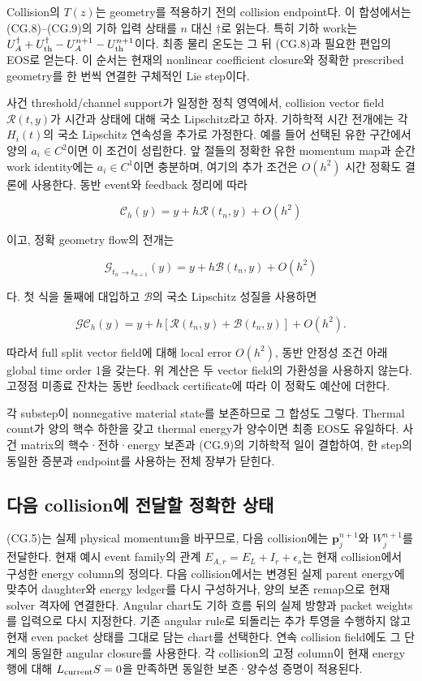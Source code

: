 \documentclass[11pt,a4paper]{article}
\begin{document}
Collision의 \(T(z)\)는 geometry를 적용하기 전의 collision endpoint다. 이 합성에서는 (CG.8)--(CG.9)의 기하 입력 상태를 \(n\) 대신 \(\dagger\)로 읽는다. 특히 기하 work는 \(U_A^\dagger+U_{\rm th}^\dagger-U_A^{n+1}-U_{\rm th}^{n+1}\)이다. 최종 물리 온도는 그 뒤 (CG.8)과 필요한 편입의 EOS로 얻는다. 이 순서는 현재의 nonlinear coefficient closure와 정확한 prescribed geometry를 한 번씩 연결한 구체적인 Lie step이다.

사건 threshold/channel support가 일정한 정칙 영역에서, collision vector field \(\mathcal R(t,y)\)가 시간과 상태에 대해 국소 Lipschitz라고 하자. 기하학적 시간 전개에는 각 \(H_i(t)\)의 국소 Lipschitz 연속성을 추가로 가정한다. 예를 들어 선택된 유한 구간에서 양의 \(a_i\in C^2\)이면 이 조건이 성립한다. 앞 절들의 정확한 유한 momentum map과 순간 work identity에는 \(a_i\in C^1\)이면 충분하며, 여기의 추가 조건은 \(O(h^2)\) 시간 정확도 결론에 사용한다. 동반 event와 feedback 정리에 따라

\[
\mathcal C_h(y)=y+h\mathcal R(t_n,y)+O(h^2)
\]

이고, 정확 geometry flow의 전개는

\[
\mathcal G_{t_n\to t_{n+1}}(y)
=y+h\mathcal B(t_n,y)+O(h^2)
\]

다. 첫 식을 둘째에 대입하고 \(\mathcal B\)의 국소 Lipschitz 성질을 사용하면

\[
\mathcal G\mathcal C_h(y)
=y+h[\mathcal R(t_n,y)+\mathcal B(t_n,y)]+O(h^2).
\tag{CG.11}
\]

따라서 full split vector field에 대해 local error \(O(h^2)\), 동반 안정성 조건 아래 global time order 1을 갖는다. 위 계산은 두 vector field의 가환성을 사용하지 않는다. 고정점 미종료 잔차는 동반 feedback certificate에 따라 이 정확도 예산에 더한다.

각 substep이 nonnegative material state를 보존하므로 그 합성도 그렇다. Thermal count가 양의 핵수 하한을 갖고 thermal energy가 양수이면 최종 EOS도 유일하다. 사건 matrix의 핵수·전하·energy 보존과 (CG.9)의 기하학적 일이 결합하여, 한 step의 동일한 증분과 endpoint를 사용하는 전체 장부가 닫힌다.

\hypertarget{uxb2e4uxc74c-collisionuxc5d0-uxc804uxb2ecuxd560-uxc815uxd655uxd55c-uxc0c1uxd0dc}{%
\subsection{다음 collision에 전달할 정확한 상태}\label{uxb2e4uxc74c-collisionuxc5d0-uxc804uxb2ecuxd560-uxc815uxd655uxd55c-uxc0c1uxd0dc}}

(CG.5)는 실제 physical momentum을 바꾸므로, 다음 collision에는 \(\boldsymbol p_j^{n+1}\)와 \(W_j^{n+1}\)를 전달한다. 현재 예시 event family의 관계 \(E_{A,r}=E_L+I_r+\epsilon_s\)는 현재 collision에서 구성한 energy column의 정의다. 다음 collision에서는 변경된 실제 parent energy에 맞추어 daughter와 energy ledger를 다시 구성하거나, 양의 보존 remap으로 현재 solver 격자에 연결한다. Angular chart도 기하 흐름 뒤의 실제 방향과 packet weights를 입력으로 다시 지정한다. 기존 angular rule로 되돌리는 추가 투영을 수행하지 않고 현재 even packet 상태를 그대로 담는 chart를 선택한다. 연속 collision field에도 그 단계의 동일한 angular closure를 사용한다. 각 collision의 고정 column이 현재 energy 행에 대해 \(L_{\rm current}S=0\)을 만족하면 동일한 보존·양수성 증명이 적용된다.
\end{document}
